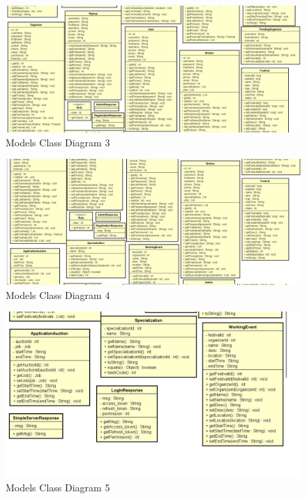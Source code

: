 \begin{figure}[H]
	\includegraphics[width=\linewidth]{diagrams/Models Class Diagram_3.png}
	\caption{Models Class Diagram 3}
	\label{fig:models_class_diag_3}
\end{figure}

\begin{figure}[H]
	\includegraphics[width=\linewidth]{diagrams/Models Class Diagram_4.png}
	\caption{Models Class Diagram 4}
	\label{fig:models_class_diag_4}
\end{figure}

\begin{figure}[H]
	\includegraphics[width=\linewidth]{diagrams/Models Class Diagram_5.png}
	\caption{Models Class Diagram 5}
	\label{fig:models_class_diag_5}
\end{figure}


